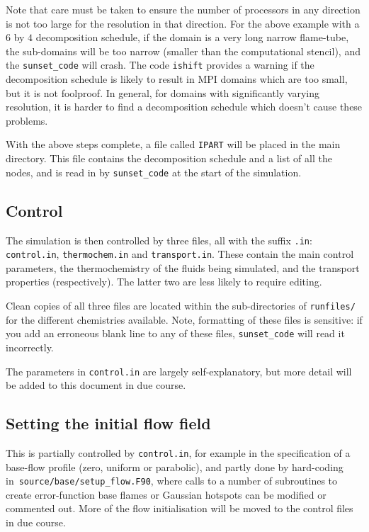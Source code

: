 \documentclass[notitlepage]{revtex4-1}
\begin{document}
Note that care must be taken to ensure the number of processors in any direction is not too large for the resolution in that direction. For the above example with a $6$ by $4$ decomposition schedule, if the domain is a very long narrow flame-tube, the sub-domains will be too narrow (smaller than the computational stencil), and the \verb|sunset_code| will crash. The code \verb|ishift| provides a warning if the decomposition schedule is likely to result in MPI domains which are too small, but it is not foolproof. In general, for domains with significantly varying resolution, it is harder to find a decomposition schedule which doesn't cause these problems.

With the above steps complete, a file called \verb|IPART| will be placed in the main directory. This file contains the decomposition schedule and a list of all the nodes, and is read in by \verb|sunset_code| at the start of the simulation.

\subsection{Control}

The simulation is then controlled by three files, all with the suffix \verb|.in|: \verb|control.in|, \verb|thermochem.in| and \verb|transport.in|. These contain the main control parameters, the thermochemistry of the fluids being simulated, and the transport properties (respectively). The latter two are less likely to require editing.

Clean copies of all three files are located within the sub-directories of \verb|runfiles/| for the different chemistries available. Note, formatting of these files is sensitive: if you add an erroneous blank line to any of these files, \verb|sunset_code| will read it incorrectly.

The parameters in \verb|control.in| are largely self-explanatory, but more detail will be added to this document in due course. 

\subsection{Setting the initial flow field}

This is partially controlled by \verb|control.in|, for example in the specification of a base-flow profile (zero, uniform or parabolic), and partly done by hard-coding in~\verb|source/base/setup_flow.F90|, where calls to a number of subroutines to create error-function base flames or Gaussian hotspots can be modified or commented out. More of the flow initialisation will be moved to the control files in due course.
\end{document}
